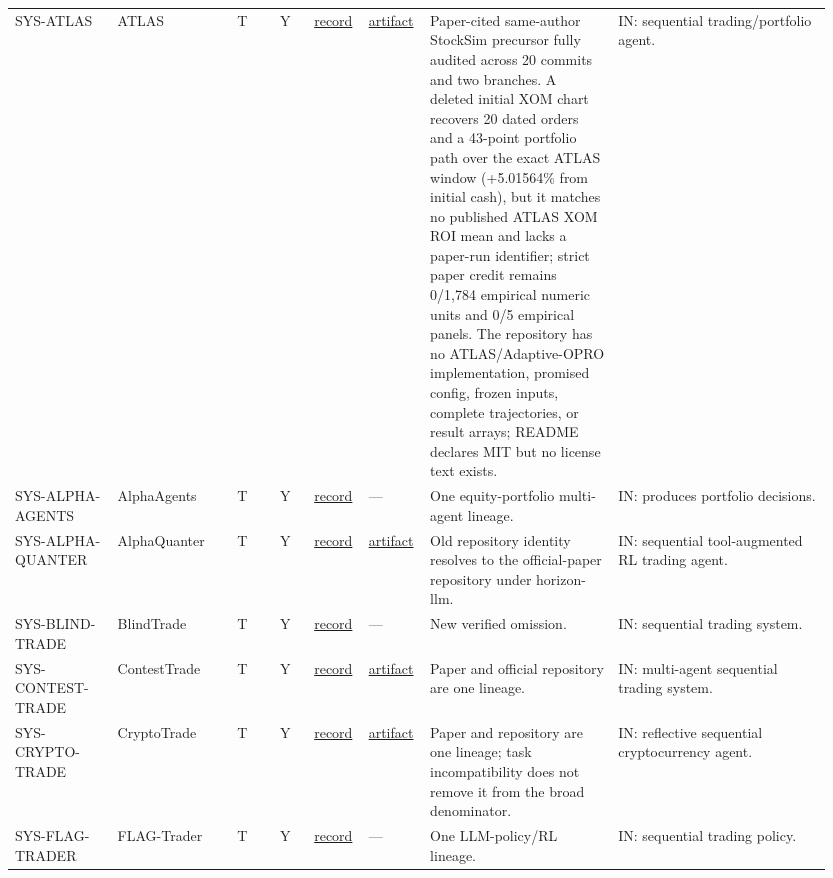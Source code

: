 \begin{longtable}{@{}L{0.12\linewidth}L{0.14\linewidth}L{0.05\linewidth}L{0.04\linewidth}L{0.06\linewidth}L{0.07\linewidth}L{0.22\linewidth}L{0.25\linewidth}@{}}
SYS-\allowbreak{}ATLAS & ATLAS & T & Y & \href{https://arxiv.org/abs/2510.15949}{record} & \href{https://github.com/harrypapadakis/StockSim}{artifact} & Paper-cited same-author StockSim precursor fully audited across 20 commits and two branches. A deleted initial XOM chart recovers 20 dated orders and a 43-point portfolio path over the exact ATLAS window (+5.01564\% from initial cash), but it matches no published ATLAS XOM ROI mean and lacks a paper-run identifier; strict paper credit remains 0/1,784 empirical numeric units and 0/5 empirical panels. The repository has no ATLAS/Adaptive-OPRO implementation, promised config, frozen inputs, complete trajectories, or result arrays; README declares MIT but no license text exists. & IN: sequential trading/portfolio agent. \\
SYS-\allowbreak{}ALPHA-\allowbreak{}AGENTS & AlphaAgents & T & Y & \href{https://arxiv.org/abs/2508.11152}{record} & --- & One equity-portfolio multi-agent lineage. & IN: produces portfolio decisions. \\
SYS-\allowbreak{}ALPHA-\allowbreak{}QUANTER & AlphaQuanter & T & Y & \href{https://aclanthology.org/2026.findings-acl.456/}{record} & \href{https://github.com/horizon-llm/AlphaQuanter}{artifact} & Old repository identity resolves to the official-paper repository under horizon-llm. & IN: sequential tool-augmented RL trading agent. \\
SYS-\allowbreak{}BLIND-\allowbreak{}TRADE & BlindTrade & T & Y & \href{https://arxiv.org/abs/2603.17692}{record} & --- & New verified omission. & IN: sequential trading system. \\
SYS-\allowbreak{}CONTEST-\allowbreak{}TRADE & ContestTrade & T & Y & \href{https://arxiv.org/abs/2508.00554}{record} & \href{https://github.com/FinStep-AI/ContestTrade}{artifact} & Paper and official repository are one lineage. & IN: multi-agent sequential trading system. \\
SYS-\allowbreak{}CRYPTO-\allowbreak{}TRADE & CryptoTrade & T & Y & \href{https://aclanthology.org/2024.emnlp-main.63/}{record} & \href{https://github.com/Xtra-Computing/CryptoTrade}{artifact} & Paper and repository are one lineage; task incompatibility does not remove it from the broad denominator. & IN: reflective sequential cryptocurrency agent. \\
SYS-\allowbreak{}FLAG-\allowbreak{}TRADER & FLAG-Trader & T & Y & \href{https://aclanthology.org/2025.findings-acl.716/}{record} & --- & One LLM-policy/RL lineage. & IN: sequential trading policy. \\

\end{longtable}
